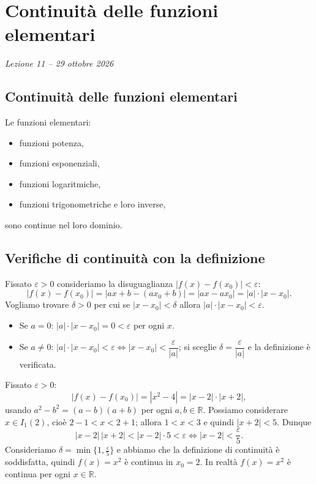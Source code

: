 \documentclass[11pt,a4paper]{article}
\begin{document}
\section[Continuità delle funzioni elementari (Lezione 11 -- 29 ottobre 2026)]{Continuità delle funzioni elementari}
\noindent\emph{Lezione 11 -- 29 ottobre 2026}
\subsection{Continuità delle funzioni elementari}

Le funzioni elementari:
\begin{itemize}
    \item funzioni potenza,
    \item funzioni esponenziali,
    \item funzioni logaritmiche,
    \item funzioni trigonometriche e loro inverse,
\end{itemize}
sono continue nel loro dominio.

\subsection{Verifiche di continuità con la definizione}

\begin{esempio}[$f(x) = ax + b$ è continua in ogni $x_0 \in \mathbb{R}$, con $a, b \in \mathbb{R}$]
Fissato $\varepsilon > 0$ consideriamo la disuguaglianza $|f(x) - f(x_0)| < \varepsilon$:
\[
|f(x) - f(x_0)| = |ax + b - (ax_0 + b)| = |ax - ax_0| = |a|\cdot|x - x_0| .
\]
Vogliamo trovare $\delta > 0$ per cui se $|x - x_0| < \delta$ allora $|a|\cdot|x - x_0| < \varepsilon$.
\begin{itemize}
    \item Se $a = 0$: $|a|\cdot|x-x_0| = 0 < \varepsilon$ per ogni $x$.
    \item Se $a \neq 0$: $|a|\cdot|x - x_0| < \varepsilon \iff |x - x_0| < \dfrac{\varepsilon}{|a|}$; si sceglie $\delta = \dfrac{\varepsilon}{|a|}$ e la definizione è verificata.
\end{itemize}
\end{esempio}

\begin{esempio}[$f(x) = x^2$ è continua in $x_0 = 2$]
Fissato $\varepsilon > 0$:
\[
|f(x) - f(x_0)| = |x^2 - 4| = |x - 2|\cdot|x + 2| ,
\]
usando $a^2 - b^2 = (a - b)(a + b)$ per ogni $a, b \in \mathbb{R}$. Possiamo considerare $x \in I_1(2)$, cioè $2 - 1 < x < 2 + 1$; allora $1 < x < 3$ e quindi $|x + 2| < 5$. Dunque
\[
|x - 2|\,|x + 2| < |x - 2| \cdot 5 < \varepsilon \iff |x - 2| < \frac{\varepsilon}{5} .
\]
Consideriamo $\delta = \min\{1, \frac{\varepsilon}{5}\}$ e abbiamo che la definizione di continuità è soddisfatta, quindi $f(x) = x^2$ è continua in $x_0 = 2$. In realtà $f(x) = x^2$ è continua per ogni $x \in \mathbb{R}$.
\end{esempio}
\end{document}
